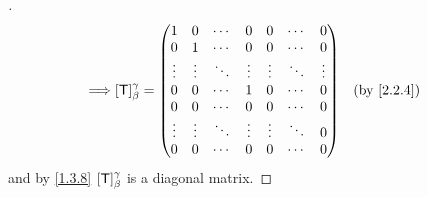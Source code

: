 \begin{proof}[]
\begin{align*}
    \implies & [\T]_{\beta}^{\gamma} = \begin{pmatrix}
                                         1      & 0      & \cdots & 0      & 0      & \cdots & 0      \\
                                         0      & 1      & \cdots & 0      & 0      & \cdots & 0      \\
                                         \vdots & \vdots & \ddots & \vdots & \vdots & \ddots & \vdots \\
                                         0      & 0      & \cdots & 1      & 0      & \cdots & 0      \\
                                         0      & 0      & \cdots & 0      & 0      & \cdots & 0      \\
                                         \vdots & \vdots & \ddots & \vdots & \vdots & \ddots & 0      \\
                                         0      & 0      & \cdots & 0      & 0      & \cdots & 0
                                       \end{pmatrix} &  & \text{(by \cref{2.2.4})}
  \end{align*}
  and by \cref{1.3.8} \([\mathsf{T}]_{\beta}^{\gamma}\) is a diagonal matrix.
\end{proof}
